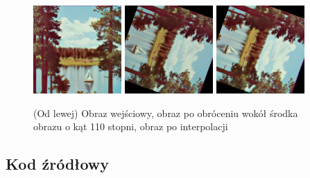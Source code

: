 \documentclass[final,a4paper,openany,12pt]{mwbk}
\begin{document}
\begin{figure}[H]
	\begin{center}
		\includegraphics[width=0.3\textwidth]{2/2Geo_Turn_Original}
		\includegraphics[width=0.3\textwidth]{2/2Geo_Turn_Result}
		\includegraphics[width=0.3\textwidth]{2/2Geo_Turn_Result_Interp}
	\end{center}
	\caption{(Od lewej) Obraz wejściowy, obraz po obróceniu wokół  środka obrazu o kąt 110 stopni, obraz po interpolacji }
\end{figure}


\subsection*{Kod źródłowy}
\end{document}
